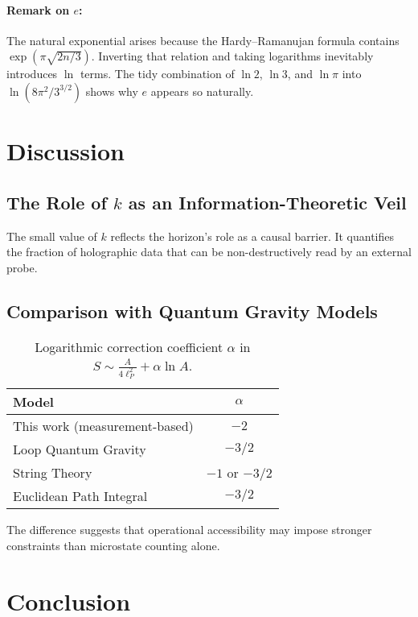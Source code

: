 \documentclass[12pt, letterpaper]{article}
\begin{document}
\paragraph{Remark on $e$:} The natural exponential arises because the Hardy–Ramanujan formula contains $\exp(\pi\sqrt{2n/3})$. Inverting that relation and taking logarithms inevitably introduces $\ln$ terms. The tidy combination of $\ln 2$, $\ln 3$, and $\ln \pi$ into $\ln(8\pi^2/3^{3/2})$ shows why $e$ appears so naturally.

\section{Discussion}

\subsection{The Role of $k$ as an Information-Theoretic Veil}

The small value of $k$ reflects the horizon's role as a causal barrier. It quantifies the fraction of holographic data that can be non-destructively read by an external probe.

\subsection{Comparison with Quantum Gravity Models}

\begin{table}[h!]
\centering
\caption{Logarithmic correction coefficient $\alpha$ in $S \sim \frac{A}{4\ell_P^2} + \alpha \ln A$.}
\label{tab:comparison}
\begin{tabular}{lc}
\toprule
\textbf{Model} & $\alpha$ \\
\midrule
This work (measurement-based) & $-2$ \\
Loop Quantum Gravity & $-3/2$ \\
String Theory & $-1$ or $-3/2$ \\
Euclidean Path Integral & $-3/2$ \\
\bottomrule
\end{tabular}
\end{table}

The difference suggests that operational accessibility may impose stronger constraints than microstate counting alone.

\section{Conclusion}
\end{document}

